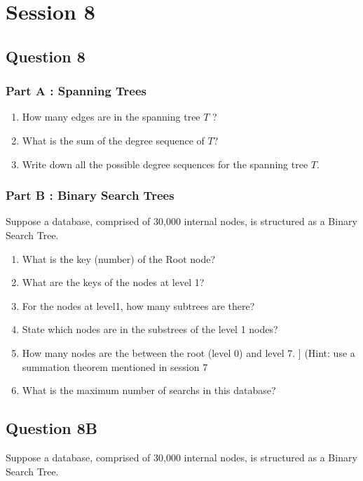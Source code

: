 
\chapter{Session 8}
\section*{Question 8}
\subsection*{Part A : Spanning Trees}
\begin{enumerate}
\item How many edges are in the spanning tree $T$ ?
\item What is the sum of the degree sequence of $T$?
\item Write down all the possible degree sequences for the spanning tree $T$.
\end{enumerate}

\subsection*{Part B : Binary Search Trees}
Suppose a database, comprised of 30,000 internal nodes, is structured as a Binary Search Tree.

\begin{enumerate}
\item What is the key (number) of the Root node?
\item What are the keys of the nodes at level 1?
\item For the nodes at level1, how many subtrees are there?
\item State which nodes are in the substrees of the level 1 nodes?
\item How many nodes are the between the root (level 0) and level 7. ]
(Hint: use a summation theorem mentioned in session 7
\item What is the maximum number of searchs in this database?
\end{enumerate}




\section{Question 8B}
Suppose a database, comprised of 30,000 internal nodes, is structured as a Binary Search Tree.

